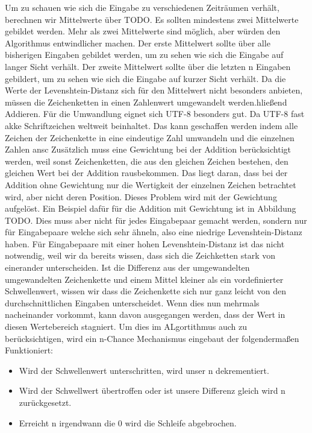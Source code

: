 \documentclass{article}
\begin{document}
    Um zu schauen wie sich die Eingabe zu verschiedenen Zeiträumen verhält, berechnen wir Mittelwerte über TODO. Es sollten mindestens zwei Mittelwerte gebildet werden. Mehr als zwei Mittelwerte sind möglich, aber würden den Algorithmus entwindlicher machen. Der erste Mittelwert sollte über alle bisherigen Eingaben gebildet werden, um zu sehen wie sich die Eingabe auf langer Sicht verhält. Der zweite Mittelwert sollte über die letzten n Eingaben gebildert, um zu sehen wie sich die Eingabe auf kurzer Sicht verhält.
    Da die Werte der Levenshtein-Distanz sich für den Mittelwert nicht besonders anbieten, müssen die Zeichenketten in einen Zahlenwert umgewandelt werden.hließend Addieren. Für die Umwandlung eignet sich UTF-8 besonders gut. Da UTF-8 fast akke Schriftzeichen weltweit beinhaltet.
    Das kann geschaffen werden indem alle Zeichen der Zeichenkette in eine eindeutige Zahl umwandeln und die einzelnen Zahlen ansc
    Zusätzlich muss eine Gewichtung bei der Addition berücksichtigt werden, weil sonst Zeichenketten, die aus den gleichen Zeichen bestehen, den gleichen Wert bei der Addition rausbekommen. Das liegt daran, dass bei der Addition ohne Gewichtung nur die Wertigkeit der einzelnen Zeichen betrachtet wird, aber nicht deren Position. Dieses Problem wird mit der Gewichtung aufgelöst. Ein Beispiel dafür für die Addition mit Gewichtung ist in Abbildung TODO.
    Dies muss aber nicht für jedes Eingabepaar gemacht werden, sondern nur für Eingabepaare welche sich sehr ähneln, also eine niedrige Levenshtein-Distanz haben. Für Eingabepaare mit einer hohen Levenshtein-Distanz ist das nicht notwendig, weil wir da bereits wissen, dass sich die Zeichketten stark von einerander unterscheiden.
    Ist die Differenz aus der umgewandelten umgewandelten Zeichenkette und einem Mittel kleiner als ein vordefinierter Schwellenwert, wissen wir dass die Zeichenkette sich nur ganz leicht von den durchschnittlichen Eingaben unterscheidet.
    Wenn dies nun mehrmals nacheinander vorkommt, kann davon ausgegangen werden, dass der Wert in diesen Wertebereich stagniert.
    Um dies im ALgortithmus auch zu berücksichtigen, wird ein n-Chance Mechanismus eingebaut der folgendermaßen Funktioniert:
    \begin{itemize}
        \item Wird der Schwellenwert unterschritten, wird unser n dekrementiert.
        \item Wird der Schwellwert übertroffen oder ist unsere Differenz gleich wird n zurückgesetzt.
        \item Erreicht n irgendwann die 0 wird die Schleife abgebrochen. 
    \end{itemize}
\end{document}
